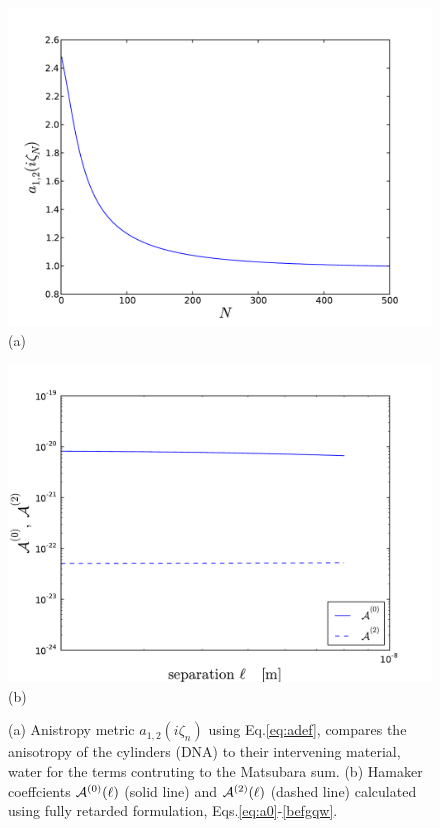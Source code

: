 \documentclass[onecolumn,letterpaper,amsmath,amssymb,floatfix,aps,superscriptaddress]{revtex4}
\begin{document}
\begin{figure}%
\begin{center}
\begin{minipage}[b]{0.40\textwidth}
\begin{center}
\includegraphics[width=1.2\textwidth]{./140220_cyl-cyl/aiz.pdf} (a)
\end{center}
\end{minipage}
\hskip 43pt
\begin{minipage}[b]{0.40\textwidth}
\begin{center}
\includegraphics[width=1.2\textwidth]{./140220_cyl-cyl/Full_skew_A0_A2.pdf} (b)
\end{center}
\end{minipage}
\caption{(a) Anistropy metric $a_{1,2}(i\zeta_n)$ using Eq.\ref{eq:adef}, compares the anisotropy of the  cylinders (DNA) to their intervening material, water for the terms contruting to the Matsubara sum. (b) Hamaker coeffcients ${\cal A}^{(0)}(\ell)$ (solid line) and ${\cal A}^{(2)}(\ell)$ (dashed line) calculated using fully retarded formulation, Eqs.\ref{eq:a0}-\ref{befgqw}.}
\label{fiddle1}
\end{center}
\end{figure} 
\end{document}

